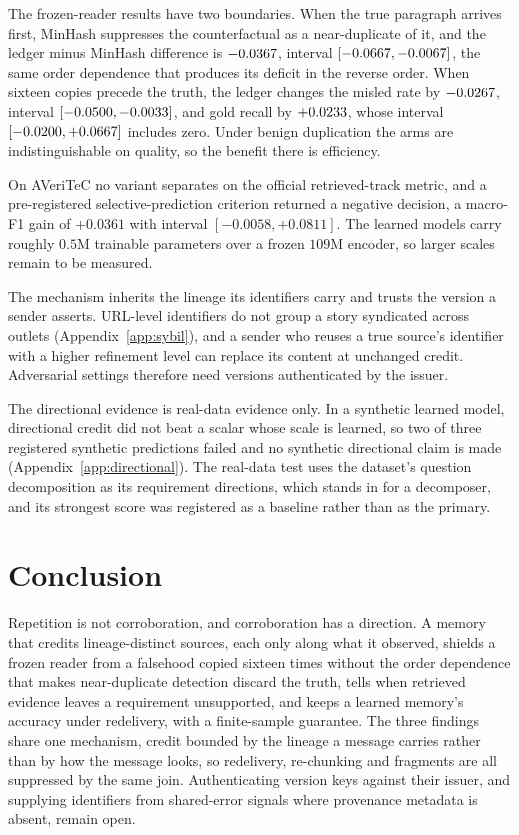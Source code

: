 \documentclass{article}
\begin{document}
The frozen-reader results have two boundaries. When the true paragraph arrives
first, MinHash suppresses the counterfactual as a near-duplicate of it, and the
ledger minus MinHash difference is $-0.0367$, interval
$[-0.0667, -0.0067]$, the same order dependence that produces its deficit in the
reverse order. When sixteen copies precede the truth, the ledger changes the
misled rate by $-0.0267$, interval $[-0.0500, -0.0033]$, and
gold recall by $+0.0233$, whose interval $[-0.0200, +0.0667]$
includes zero. Under benign duplication the arms are indistinguishable on
quality, so the benefit there is efficiency.

On AVeriTeC no variant separates on the official retrieved-track metric, and a
pre-registered selective-prediction criterion returned a negative decision, a
macro-F1 gain of $+0.0361$ with interval $[-0.0058, +0.0811]$. The learned
models carry roughly $0.5$M trainable parameters over a frozen $109$M encoder,
so larger scales remain to be measured.

The mechanism inherits the lineage its identifiers carry and trusts the version
a sender asserts. URL-level identifiers do not group a story syndicated across
outlets (Appendix~\ref{app:sybil}), and a sender who reuses a true source's
identifier with a higher refinement level can replace its content at unchanged
credit. Adversarial settings therefore need versions authenticated by the
issuer.

The directional evidence is real-data evidence only. In a synthetic learned
model, directional credit did not beat a scalar whose scale is learned, so two of
three registered synthetic predictions failed and no synthetic directional claim
is made (Appendix~\ref{app:directional}). The real-data test uses the dataset's
question decomposition as its requirement directions, which stands in for a
decomposer, and its strongest score was registered as a baseline rather than as
the primary.

\section{Conclusion}
\label{sec:conclusion}

Repetition is not corroboration, and corroboration has a direction. A memory
that credits lineage-distinct sources, each only along what it observed, shields
a frozen reader from a falsehood copied sixteen times without the order
dependence that makes near-duplicate detection discard the truth, tells when
retrieved evidence leaves a requirement unsupported, and keeps a learned
memory's accuracy under redelivery, with a finite-sample guarantee. The three
findings share one mechanism, credit bounded by the lineage a message carries
rather than by how the message looks, so redelivery, re-chunking and fragments
are all suppressed by the same join. Authenticating version keys against their
issuer, and supplying identifiers from shared-error signals where provenance
metadata is absent, remain open.
\end{document}
